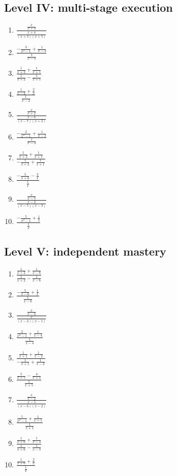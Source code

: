 \documentclass[11pt,oneside]{book}
\begin{document}
\subsection*{Level IV: multi-stage execution}
\begin{enumerate}[leftmargin=*,label=\textbf{\arabic*.},itemsep=0.65\baselineskip]
\item $\displaystyle \frac{\frac{x}{x + 3}}{\frac{x + 4}{\left(x + 3\right) \left(x + 5\right)}}$
\item $\displaystyle \frac{- \frac{3}{x^{2} - 1} + \frac{1}{x - 3}}{\frac{1}{x - 3}}$
\item $\displaystyle \frac{\frac{1}{x + 2} + \frac{1}{x + 1}}{\frac{1}{x + 2} - \frac{1}{x + 1}}$
\item $\displaystyle \frac{\frac{1}{x - 2} + \frac{2}{x}}{\frac{1}{x - 2}}$
\item $\displaystyle \frac{\frac{x}{x + 2}}{\frac{x - 6}{\left(x - 7\right) \left(x + 2\right)}}$
\item $\displaystyle \frac{- \frac{2}{x^{2} - 1} + \frac{1}{x - 3}}{\frac{1}{x - 3}}$
\item $\displaystyle \frac{\frac{1}{x + 2} + \frac{1}{x + 1}}{- \frac{1}{x + 2} + \frac{1}{x + 1}}$
\item $\displaystyle \frac{- \frac{5}{x + 6} - \frac{3}{x}}{\frac{1}{x}}$
\item $\displaystyle \frac{\frac{x}{x - 5}}{\frac{x - 2}{\left(x - 5\right) \left(x - 3\right)}}$
\item $\displaystyle \frac{- \frac{5}{x^{2} - 1} + \frac{1}{x}}{\frac{1}{x}}$
\end{enumerate}
\subsection*{Level V: independent mastery}
\begin{enumerate}[leftmargin=*,label=\textbf{\arabic*.},itemsep=0.65\baselineskip]
\item $\displaystyle \frac{\frac{1}{x + 2} + \frac{1}{x - 6}}{\frac{1}{x + 2} - \frac{1}{x - 6}}$
\item $\displaystyle \frac{- \frac{5}{x - 6} + \frac{1}{x}}{\frac{1}{x - 6}}$
\item $\displaystyle \frac{\frac{x}{x - 2}}{\frac{x}{\left(x - 2\right) \left(x - 1\right)}}$
\item $\displaystyle \frac{\frac{2}{x^{2} - 1} + \frac{1}{x - 4}}{\frac{1}{x - 4}}$
\item $\displaystyle \frac{\frac{1}{x + 1} + \frac{1}{x - 2}}{- \frac{1}{x + 1} + \frac{1}{x - 2}}$
\item $\displaystyle \frac{\frac{5}{x + 5} - \frac{4}{x + 1}}{\frac{1}{x + 5}}$
\item $\displaystyle \frac{\frac{x}{x - 2}}{\frac{x - 5}{\left(x - 6\right) \left(x - 2\right)}}$
\item $\displaystyle \frac{\frac{5}{x^{2} - 1} + \frac{1}{x + 1}}{\frac{1}{x + 1}}$
\item $\displaystyle \frac{\frac{1}{x + 6} + \frac{1}{x - 3}}{\frac{1}{x + 6} - \frac{1}{x - 3}}$
\item $\displaystyle \frac{\frac{1}{x + 6} + \frac{2}{x}}{\frac{1}{x}}$
\end{enumerate}
\end{document}
